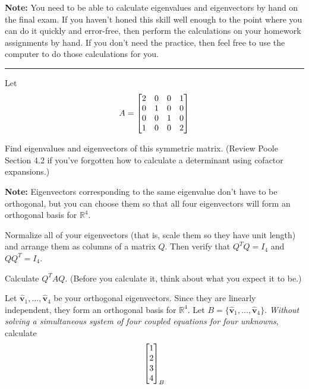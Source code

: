 \documentclass[boxes]{gsypset}
\begin{document}
\textsf{\textbf{Note:}} You need to be able to calculate eigenvalues and eigenvectors by hand on the final exam. If you haven't honed this skill well enough to the point where you can do it quickly and error-free, then perform the calculations on your homework assignments by hand. If you don't need the practice, then feel free to use the computer to do those calculations for you.
\vspace{.5\baselineskip}\hrule

\begin{problem}
	Let
	\[
		A=\begin{bmatrix}2 & 0 & 0 & 1 \\ 0 & 1 & 0 & 0 \\ 0 & 0 & 1 & 0 \\ 1 & 0 & 0 & 2\end{bmatrix}
	\]
	\begin{subproblems}
		\subproblem Find eigenvalues and eigenvectors of this symmetric matrix. 
			(Review Poole Section 4.2 if you've forgotten how to calculate a determinant using cofactor expansions.)
			
			\textbf{Note:} Eigenvectors corresponding to the same eigenvalue don't have to be orthogonal, 
			but you can choose them so that all four eigenvectors will form an orthogonal basis for $\mathbb{R}^4$.
			\begin{solution}
				
			\end{solution}
		\subproblem Normalize all of your eigenvectors (that is, scale them so they have unit length) 
			and arrange them as columns of a matrix $Q$. Then verify that $Q^TQ=I_4$ and $QQ^T=I_4$.
			\begin{solution}
				
			\end{solution}
		\subproblem Calculate $Q^TAQ$. (Before you calculate it, think about what you expect it to be.)
			\begin{solution}
				
			\end{solution}
		\subproblem Let $\hat{\mathbf{v}}_1,\dots,\hat{\mathbf{v}}_4$ be your orthogonal eigenvectors. 
			Since they are linearly independent, they form an orthogonal basis for $\mathbb{R}^4$. 
			Let $B=\{\hat{\mathbf{v}}_1,\dots,\hat{\mathbf{v}}_4\}$. 
			\textit{Without solving a simultaneous system of four coupled equations for four unknowns}, 
			calculate
			\[
				\begin{bmatrix}1\\2\\3\\4\end{bmatrix}_B
			\]
			\begin{solution}
				
			\end{solution}
	\end{subproblems}
\end{problem}
\end{document}
